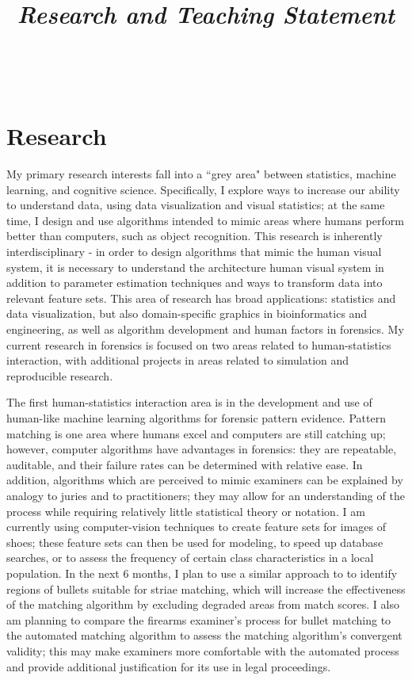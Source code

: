 \documentclass[12pt, letterpaper, sans]{moderncv}
\title{\emph{Research and Teaching Statement}}
\makeatletter
\newcommand{\makesimpletitle}{%
  \recomputeletterlengths%

  \begin{varwidth}[c]{.75\textwidth}
  \if@left\raggedright\fi%
      \if@right\raggedleft\fi%
      \ifthenelse{\equal{\@title}{}}{}{\titlestyle{\@title}}%
  \end{varwidth}\hfill
  \begin{varwidth}[c]{.25\textwidth}%
      \raggedleft%
      \addressfont\textcolor{color2}{%
        {\bfseries\upshape\@firstname~\@lastname}\\
        \ifthenelse{\isundefined{\@addressstreet}}{}{\makenewline\addresssymbol\@addressstreet%
          \ifthenelse{\equal{\@addresscity}{}}{}{\makenewline\@addresscity}%
          \ifthenelse{\equal{\@addresscountry}{}}{}{\makenewline\@addresscountry}}%
        \collectionloop{phones}{%
          \makenewline\csname\collectionloopkey phonesymbol\endcsname\collectionloopitem}%
        \ifthenelse{\isundefined{\@email}}{}{\makenewline\emailsymbol\emaillink{\@email}}%
        \ifthenelse{\isundefined{\@homepage}}{}{\makenewline\homepagesymbol\httplink{\@homepage}}%
        \ifthenelse{\isundefined{\@extrainfo}}{}{\makenewline\@extrainfo}}
    \end{varwidth}
}
\makeatother
\begin{document}
\makesimpletitle

\section{Research}

My primary research interests fall into a ``grey area" between statistics, machine learning, and cognitive science. Specifically, I explore ways to increase our ability to understand data, using data visualization and visual statistics; at the same time, I design and use algorithms intended to mimic areas where humans perform better than computers, such as object recognition. This research is inherently interdisciplinary - in order to design algorithms that mimic the human visual system, it is necessary to understand the architecture human visual system in addition to parameter estimation techniques and ways to transform data into relevant feature sets. This area of research has broad applications: statistics and data visualization, but also domain-specific graphics in bioinformatics and engineering, as well as algorithm development and human factors in forensics. My current research in forensics is focused on two areas related to human-statistics interaction, with additional projects in areas related to simulation and reproducible research. 

The first human-statistics interaction area is in the development and use of human-like machine learning algorithms for forensic pattern evidence. Pattern matching is one area where humans excel and computers are still catching up; however, computer algorithms have advantages in forensics: they are repeatable, auditable, and their failure rates can be determined with relative ease. In addition, algorithms which are perceived to mimic examiners can be explained by analogy to juries and to practitioners; they may allow for an understanding of the process while requiring relatively little statistical theory or notation. I am currently using computer-vision techniques to create feature sets for images of shoes; these feature sets can then be used for modeling, to speed up database searches, or to assess the frequency of certain class characteristics in a local population. In the next 6 months, I plan to use a similar approach to to identify regions of bullets suitable for striae matching, which will increase the effectiveness of the matching algorithm by excluding degraded areas from match scores. I also am planning to compare the firearms examiner's process for bullet matching to the automated matching algorithm to assess the matching algorithm's convergent validity; this may make examiners more comfortable with the automated process and provide additional justification for its use in legal proceedings. 
\end{document}
